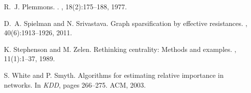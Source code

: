 \documentclass{article}
\begin{document}
\begin{thebibliography}{}
R.~J. Plemmons.
.
, 18(2):175--188, 1977.

D.~A. Spielman and N. Srivastava.
\newblock Graph sparsification by effective resistances.
, 40(6):1913--1926, 2011.

K. Stephenson and M. Zelen.
\newblock Rethinking centrality: Methods and examples.
, 11(1):1--37, 1989.

S. White and P. Smyth.
\newblock Algorithms for estimating relative importance in networks.
\newblock In {\em KDD}, pages 266--275. ACM, 2003.

\end{thebibliography}
\end{document}
